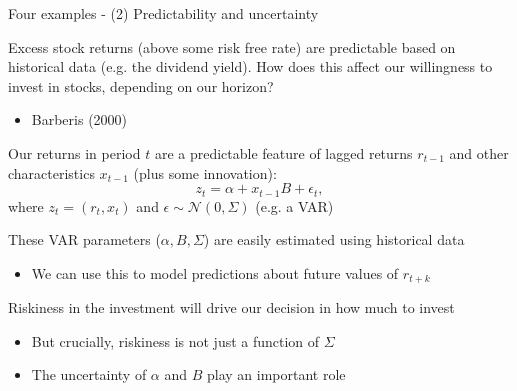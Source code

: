 \documentclass[notes,11pt, aspectratio=169]{beamer}
\newenvironment{wideitemize}{\itemize\addtolength{\itemsep}{10pt}}{\enditemize}
\begin{document}
\begin{frame}{Four examples - (2) Predictability and uncertainty}
  \begin{wideitemize}
  \item Excess stock returns (above some risk free rate) are
    predictable based on historical data (e.g. the dividend
    yield). How does this affect our willingness to invest in stocks,
    depending on our horizon?
    \begin{itemize}
    \item Barberis (2000)
    \end{itemize}
  \item Our returns in period $t$ are a predictable feature of lagged
    returns $r_{t-1}$ and other characteristics $x_{t-1}$ (plus some innovation):
    \begin{equation*}
      z_{t} = \alpha + x_{t-1}B +  \epsilon_{t},
    \end{equation*}
    where $z_{t} = (r_{t}, x_{t})$ and
    $\epsilon \sim \mathcal{N}(0,\Sigma)$ (e.g. a VAR)
  \item These VAR parameters ($\alpha, B, \Sigma$) are easily
    estimated using historical data
    \begin{itemize}
    \item We can use this to model predictions about future values of $r_{t+k}$
    \end{itemize}
  \item Riskiness in the investment will drive our decision in how much to invest
    \begin{itemize}
    \item But crucially, riskiness is not just a function of $\Sigma$
    \item The uncertainty of $\alpha$ and $B$ play an important role
    \end{itemize}
  \end{wideitemize}
\end{frame}
\end{document}
